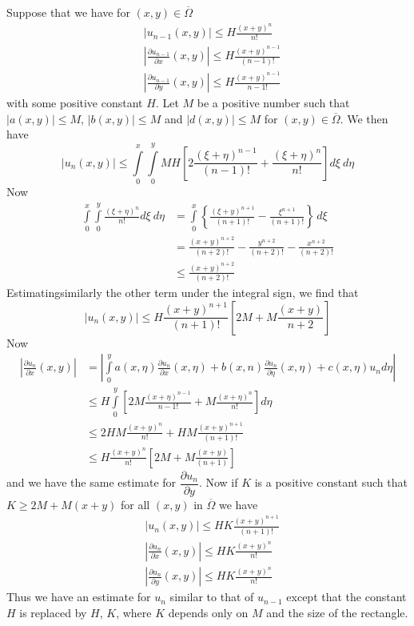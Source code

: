 Suppose that we have for $(x,y)\in \overline{\Omega}$
\begin{align*}
& |u_{n-1}(x,y)|\leq H\frac{(x+y)^{n}}{n!}\\[3pt]
& \left|\frac{\partial u_{n-1}}{\partial x}(x,y)\right|\leq H\frac{(x+y)^{n-1}}{(n-1)!}\tag{*}\\[3pt]
& \left| \frac{\partial u_{n-1}}{\partial y}(x,y)\right|\leq H \frac{(x+y)^{n-1}}{n-1!}
\end{align*}
with some positive constant $H$. Let $M$ be a positive number such that $|a(x,y)|\leq M$, $|b(x,y)|\leq M$ and $|d(x,y)|\leq M$ for $(x,y)\in \overline{\Omega}$. We then have
$$
|u_{n}(x,y)|\leq \int\limits^{x}_{0}\int\limits^{y}_{0}MH\left[2\frac{(\xi+\eta)^{n-1}}{(n-1)!}+\frac{(\xi+\eta)^{n}}{n!}\right]d\xi \ d\eta
$$
Now
\begin{align*}
\int\limits^{x}_{0}\int\limits^{y}_{0}\frac{(\xi+\eta)^{n}}{n!}d\xi \ d\eta &= \int\limits^{x}_{0}\left\{\frac{(\xi+y)^{n+1}}{(n+1)!}-\frac{\xi^{n+1}}{(n+1)!}\right\}\,d\xi\\[3pt]
&= \frac{(x+y)^{n+2}}{(n+2)!}-\frac{y^{n+2}}{(n+2)!}-\frac{x^{n+2}}{(n+2)!}\\[3pt]
&\leq \frac{(x+y)^{n+2}}{(n+2)!}
\end{align*}
Estimating\pageoriginale similarly the other term under the integral sign, we find that
$$
|u_{n}(x,y)|\leq H\frac{(x+y)^{n+1}}{(n+1)!}\left[2M+M\frac{(x+y)}{n+2}\right]
$$
Now
\begin{align*}
\left|\frac{\partial u_{n}}{\partial x}(x,y)\right| &= \left|\int\limits^{y}_{0}a(x,\eta)\frac{\partial u_{n}}{\partial x}(x,\eta)+b(x,n)\frac{\partial u_{n}}{\partial \eta}(x,\eta)+c(x,\eta)u_{n}d\eta\right|\\[3pt]
&\leq H\int\limits^{y}_{0}\left[2M\frac{(x+\eta)^{n-1}}{n-1!}+M\frac{(x+\eta)^{n}}{n!}\right]d\eta\\[3pt]
&\leq 2HM \frac{(x+y)^{n}}{n!}+HM\frac{(x+y)^{n+1}}{(n+1)!}\\[3pt]
&\leq H\frac{(x+y)^{n}}{n!}\left[2M+M\frac{(x+y)}{(n+1)}\right]
\end{align*}
and we have the same estimate for $\dfrac{\partial u_{n}}{\partial y}$. Now if $K$ is a positive constant such that $K\geq 2M+M(x+y)$ for all $(x,y)$ in $\overline{\Omega}$ we have
\begin{align*}
& |u_{n}(x,y)|\leq HK \frac{(x+y)^{n+1}}{(n+1)!}\\[3pt]
& \left| \frac{\partial u_{n}}{\partial x}(x,y)\right| \leq HK \frac{(x+y)^{n}}{n!}\\[3pt]
& \left|\frac{\partial u_{n}}{\partial y}(x,y)\right| \leq HK \frac{(x+y)^{n}}{n!} 
\end{align*}
Thus we have an estimate for $u_{n}$ similar to that of $u_{n-1}$ except that the constant $H$ is replaced by $H$, $K$, where $K$ depends only on $M$ and the size of the rectangle.

